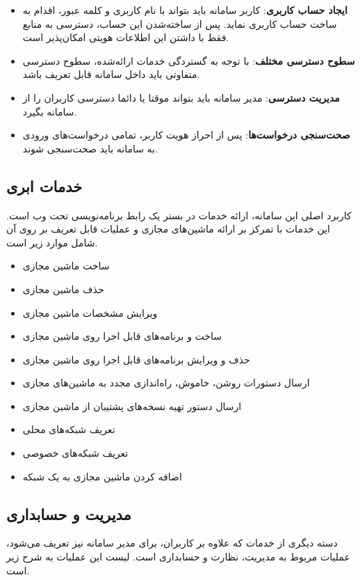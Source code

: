 \begin{itemize}
\item \textbf{ایجاد حساب کاربری}: کاربر سامانه باید بتواند با نام کاربری و کلمه عبور، اقدام به ساخت حساب کاربری نماید. پس از ساخته‌شدن این حساب، دسترسی به منابع فقط با داشتن این اطلاعات هویتی امکان‌پذیر است.

\item \textbf{سطوح دسترسی مختلف}: با توجه به گستردگی خدمات ارائه‌شده، سطوح دسترسی متفاوتی باید داخل سامانه قابل تعریف باشد.

\item \textbf{مدیریت دسترسی}: مدیر سامانه باید بتواند موقتا یا دائما دسترسی کاربران را از سامانه بگیرد.

\item \textbf{صحت‌سنجی درخواست‌ها}: پس از احراز هویت کاربر، تمامی درخواست‌های ورودی به سامانه باید صحت‌سنجی شوند.
\end{itemize}

\subsection{خدمات ابری}
کاربرد اصلی این سامانه، ارائه خدمات  در بستر یک رابط برنامه‌نویسی تحت وب است. این خدمات با تمرکز بر ارائه ماشین‌های مجازی و عملیات قابل تعریف بر روی آن شامل موارد زیر است.

\begin{itemize}
	\item ساخت ماشین مجازی
	\item حذف ماشین مجازی
	\item ویرایش مشخصات ماشین مجازی
	\item ساخت  و برنامه‌های قابل اجرا روی ماشین مجازی
	\item حذف و ویرایش برنامه‌های قابل اجرا روی ماشین مجازی
	\item ارسال دستورات روشن، خاموش، راه‌اندازی مجدد به ماشین‌های مجازی
	\item ارسال دستور تهیه نسخه‌های پشتیبان از ماشین مجازی
	\item تعریف شبکه‌های محلی
	\item تعریف شبکه‌های خصوصی
	\item اضافه کردن ماشین مجازی به یک شبکه
\end{itemize}

\subsection{مدیریت و حسابداری}
دسته دیگری از خدمات که علاوه بر کاربران، برای مدیر سامانه نیز تعریف می‌شود، عملیات مربوط به مدیریت، نظارت و حسابداری است. لیست این عملیات به شرح زیر است.

